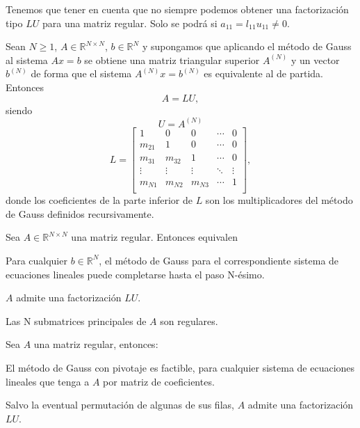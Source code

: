 Tenemos que tener en cuenta que no siempre podemos obtener una factorización tipo $LU$ para una matriz regular. Solo se podrá si $a_{11} = l_{11}u_{11} \neq 0$.

\begin{nprop}
Sean $N \geq 1$, $A \in \mathbb{R}^{N \times N}$, $b \in \mathbb{R}^N$ y supongamos que aplicando el método de Gauss al sistema $Ax = b$ se obtiene una matriz triangular superior $A^{(N)}$ y un vector $b^{(N)}$ de forma que el sistema $A^{(N)}x = b^{(N)}$ es equivalente al de partida. Entonces
\[ A = LU,\]
siendo
\[ U = A^{(N)} \]
\[ L = \begin{bmatrix}
1 & 0 & 0 & \cdots & 0 \\
m_{21} & 1 & 0 & \cdots & 0 \\
m_{31} & m_{32} & 1 & \cdots & 0 \\
\vdots &  \vdots & \vdots & \ddots & \vdots \\
m_{N1} & m_{N2} & m_{N3} & \cdots & 1 \\
\end{bmatrix}, \]
donde los coeficientes de la parte inferior de $L$ son los multiplicadores del método de Gauss definidos recursivamente.
\end{nprop}			
			
\begin{nth}
Sea $A \in \mathbb{R}^{N \times N}$ una matriz regular. Entonces equivalen
	\begin{nlist}
	\item Para cualquier $b \in \mathbb{R}^N$, el método de Gauss para el correspondiente sistema de ecuaciones lineales puede completarse hasta el paso N-ésimo.
	\item $A$ admite una factorización $LU$.
	\item Las N submatrices principales de $A$ son regulares.
	\end{nlist}
\end{nth}
			
\begin{nth}
Sea $A$ una matriz regular, entonces:
	\begin{nlist}
	\item El método de Gauss con pivotaje es factible, para cualquier sistema de ecuaciones lineales que tenga a $A$ por matriz de coeficientes.
	\item Salvo la eventual permutación de algunas de sus filas, $A$ admite una factorización $LU$.
	\end{nlist}
\end{nth}
			
